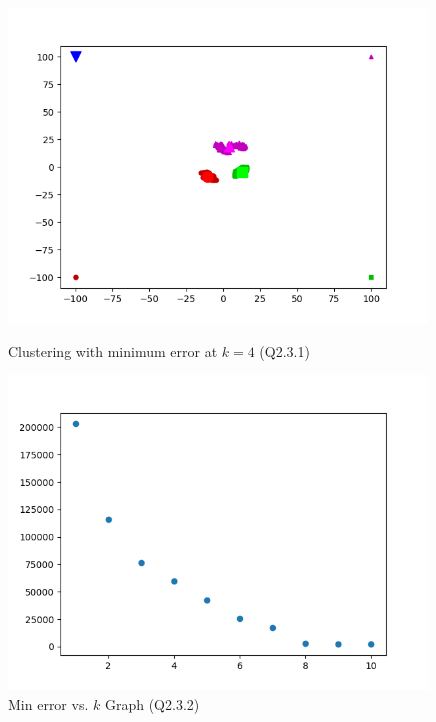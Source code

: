 \documentclass{article}
\begin{document}
\begin{figure}
    \includegraphics[width=30em]{a2_q2_3_1.png}
    \caption{Clustering with minimum error at $k=4$ (Q2.3.1)}
    \label{fig:q2_3_1}

    \includegraphics[width=30em]{a2_q2_3_2.png}
    \caption{Min error vs. $k$ Graph (Q2.3.2)}
    \label{fig:q2_3_2}
\end{figure}
\end{document}
